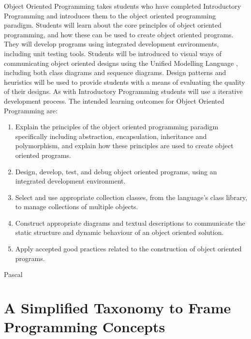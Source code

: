 
Object Oriented Programming takes students who have completed Introductory Programming and introduces them to the object oriented programming paradigm. Students will learn about the core principles of object oriented programming, and how these can be used to create object oriented programs. They will develop programs using integrated development environments, including  unit testing tools. Students will be introduced to visual ways of communicating object oriented designs using the Unified Modelling Language \cite{Fowler:2004}, including both class diagrams and sequence diagrams. Design patterns and heuristics will be used to provide students with a means of evaluating the quality of their designs. As with Introductory Programming students will use a iterative development process. The intended learning outcomes for Object Oriented Programming are:
\begin{enumerate}
	\item Explain the principles of the object oriented programming paradigm specifically including abstraction, encapsulation, inheritance and polymorphism, and explain how these principles are used to create object oriented programs.
	\item Design, develop, test, and debug object oriented programs, using an integrated development environment.
	\item Select and use appropriate collection classes, from the language's class library, to manage collections of multiple objects.
	\item Construct appropriate diagrams and textual descriptions to communicate the static structure and dynamic behaviour of an object oriented solution.
	\item Apply accepted good practices related to the construction of object oriented programs.
\end{enumerate}


Pascal \cite{Becker:2002}




\section{A Simplified Taxonomy to Frame Programming Concepts} %
\label{sec:a_simplified_taxonomy_to_frame_programming_concepts}

